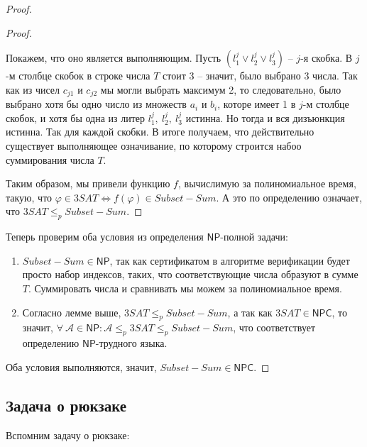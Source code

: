 \documentclass[a4paper,12pt]{article}
\newcommand{\NPclass}{\mathsf{NP}}
\newcommand{\NPCclass}{\mathsf{NPC}}
\begin{document}
\begin{proof}
\begin{proof}
\begin{itemize}
            Покажем, что оно является выполняющим. Пусть $(l_1^j \vee l_2^j \vee l_3^j)$ -- $j$-я скобка. В $j$-м столбце скобок в строке числа $T$ стоит 3 -- значит, было выбрано 3 числа. Так как из чисел $c_{j1}$ и $c_{j2}$ мы могли выбрать максимум 2, то следовательно, было выбрано хотя бы одно число  из множеств $a_i$ и $b_i$, которе имеет 1 в $j$-м столбце скобок, и хотя бы одна из литер $l_1^j,\ l_2^j,\ l_3^j$ истинна. Но тогда и вся дизъюнкция истинна. Так для каждой скобки. В итоге получаем, что действительно существует выполняющее означивание, по которому строится набоо суммирования числа $T$.
        \end{itemize}
        Таким образом, мы привели функцию $f$, вычислимую за полиномиальное время, такую, что $\varphi \in 3SAT \Longleftrightarrow f(\varphi) \in Subset-Sum$. А это по определению означает,\\ что $3SAT \leqslant_p Subset-Sum$.
    \end{proof}
    Теперь проверим оба условия из определения $\NPclass$-полной задачи:
    \begin{enumerate}
        \item $Subset-Sum \in \NPclass$, так как сертификатом в алгоритме верификации будет просто набор индексов, таких, что соответствующие числа образуют в сумме $T$. Суммировать числа и сравнивать мы можем за полиномиальное время.
        \item Согласно лемме выше, $3SAT \leqslant_p Subset-Sum$, а так как $3SAT \in \NPCclass$, то значит, $\forall\ \mathscr{A} \in \NPclass: \mathscr{A} \leqslant_p 3SAT \leqslant_p Subset-Sum$, что соответствует определению $\NPclass$-трудного языка.
    \end{enumerate}
    Оба условия выполняются, значит, $Subset-Sum \in \NPCclass$.
\end{proof}

\subsection{Задача о рюкзаке}
Вспомним задачу о рюкзаке:
\end{document}
